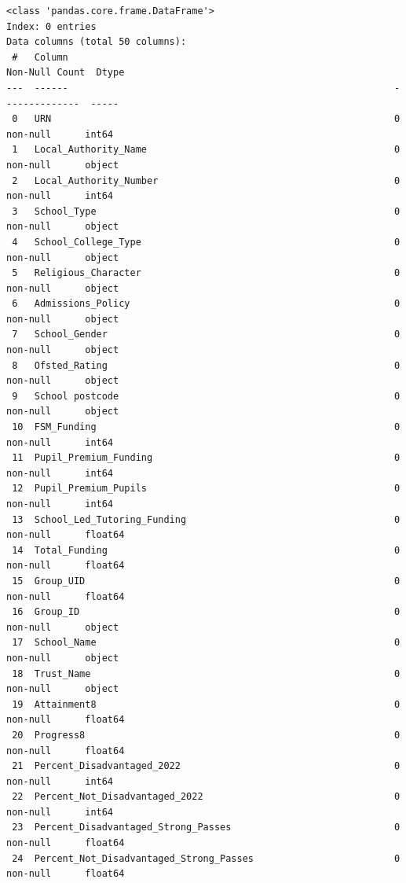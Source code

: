 \documentclass[
  letterpaper,
  DIV=11,
  numbers=noendperiod]{scrartcl}
\begin{document}
\begin{verbatim}
<class 'pandas.core.frame.DataFrame'>
Index: 0 entries
Data columns (total 50 columns):
 #   Column                                                          Non-Null Count  Dtype  
---  ------                                                          --------------  -----  
 0   URN                                                             0 non-null      int64  
 1   Local_Authority_Name                                            0 non-null      object 
 2   Local_Authority_Number                                          0 non-null      int64  
 3   School_Type                                                     0 non-null      object 
 4   School_College_Type                                             0 non-null      object 
 5   Religious_Character                                             0 non-null      object 
 6   Admissions_Policy                                               0 non-null      object 
 7   School_Gender                                                   0 non-null      object 
 8   Ofsted_Rating                                                   0 non-null      object 
 9   School postcode                                                 0 non-null      object 
 10  FSM_Funding                                                     0 non-null      int64  
 11  Pupil_Premium_Funding                                           0 non-null      int64  
 12  Pupil_Premium_Pupils                                            0 non-null      int64  
 13  School_Led_Tutoring_Funding                                     0 non-null      float64
 14  Total_Funding                                                   0 non-null      float64
 15  Group_UID                                                       0 non-null      float64
 16  Group_ID                                                        0 non-null      object 
 17  School_Name                                                     0 non-null      object 
 18  Trust_Name                                                      0 non-null      object 
 19  Attainment8                                                     0 non-null      float64
 20  Progress8                                                       0 non-null      float64
 21  Percent_Disadvantaged_2022                                      0 non-null      int64  
 22  Percent_Not_Disadvantaged_2022                                  0 non-null      int64  
 23  Percent_Disadvantaged_Strong_Passes                             0 non-null      float64
 24  Percent_Not_Disadvantaged_Strong_Passes                         0 non-null      float64

\end{verbatim}
\end{document}
